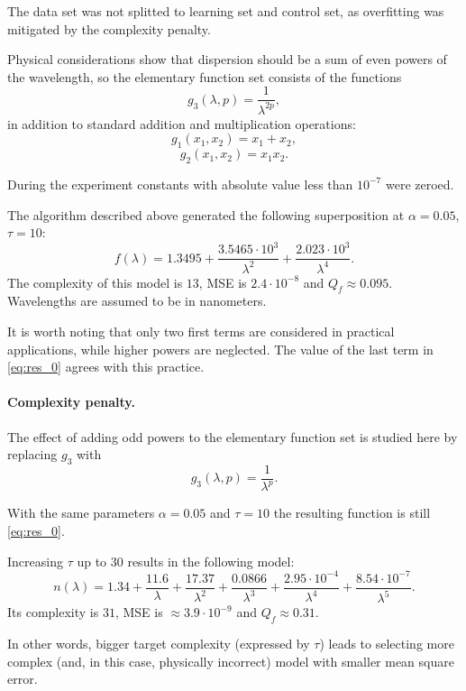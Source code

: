 \documentclass[11pt,a4paper]{article}
\theoremstyle{definition}
\begin{document}
The data set was not splitted to learning set and control set, as overfitting was
mitigated by the complexity penalty.

Physical considerations show \cite{Serova11} that dispersion should be a sum of even
powers of the wavelength, so the elementary function set consists of the functions
\[
  g_3(\lambda, p) = \frac{1}{\lambda^{2p}},
\]
in addition to standard addition and multiplication operations:
\[
  g_1(x_1, x_2) = x_1 + x_2,
\]
\[
  g_2(x_1, x_2) = x_1 x_2.
\]

During the experiment constants with absolute value less than $10^{-7}$
were zeroed.

The algorithm described above generated the following superposition at $\alpha = 0.05$, $\tau = 10$:
\begin{equation}
  f(\lambda) = 1.3495 + \frac{3.5465 \cdot 10^3}{\lambda^2} + \frac{2.023 \cdot 10^3}{\lambda^4}.
  \label{eq:res_0}
\end{equation}
The complexity of this model is $13$, MSE is $2.4 \cdot 10^{-8}$ and $Q_f \approx 0.095$.
Wavelengths are assumed to be in nanometers.

It is worth noting that only two first terms are considered in practical applications, while
higher powers are neglected. The value of the last term in \eqref{eq:res_0}
agrees with this practice.

\paragraph{Complexity penalty.}

The effect of adding odd powers to the elementary function set is studied here by replacing
$g_3$ with 
\[
  g_3(\lambda, p) = \frac{1}{\lambda^p}.
\]

With the same parameters $\alpha = 0.05$ and $\tau = 10$ the resulting function is still
\eqref{eq:res_0}.

Increasing $\tau$ up to 30 results in the following model:
\begin{equation}
  n(\lambda) = 1.34 + \frac{11.6}{\lambda} + \frac{17.37}{\lambda^2} + \frac{0.0866}{\lambda^3} + \frac{2.95 \cdot 10^{-4}}{\lambda^4} + \frac{8.54 \cdot 10^{-7}}{\lambda^5}.
  \label{eq:res_incorrect}
\end{equation}
Its complexity is $31$, MSE is $\approx 3.9 \cdot 10^{-9}$ and $Q_f \approx 0.31$.

In other words, bigger target complexity (expressed by $\tau$) leads to selecting
more complex (and, in this case, physically incorrect) model with smaller mean square error.
\end{document}
